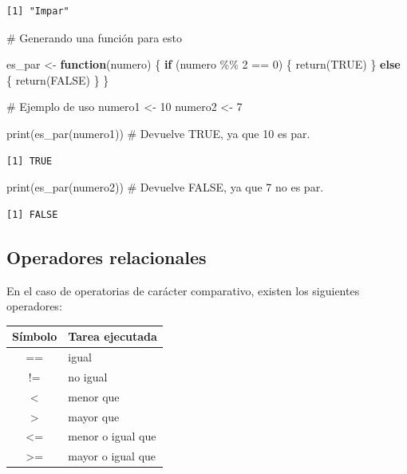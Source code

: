 \documentclass[
  letterpaper,
  DIV=11,
  numbers=noendperiod]{scrartcl}
\newenvironment{Shaded}{\begin{snugshade}}{\end{snugshade}}
\newcommand{\CommentTok}[1]{\textcolor[rgb]{0.37,0.37,0.37}{#1}}
\newcommand{\ConstantTok}[1]{\textcolor[rgb]{0.56,0.35,0.01}{#1}}
\newcommand{\ControlFlowTok}[1]{\textcolor[rgb]{0.00,0.23,0.31}{\textbf{#1}}}
\newcommand{\DecValTok}[1]{\textcolor[rgb]{0.68,0.00,0.00}{#1}}
\newcommand{\FunctionTok}[1]{\textcolor[rgb]{0.28,0.35,0.67}{#1}}
\newcommand{\NormalTok}[1]{\textcolor[rgb]{0.00,0.23,0.31}{#1}}
\newcommand{\OtherTok}[1]{\textcolor[rgb]{0.00,0.23,0.31}{#1}}
\newcommand{\SpecialCharTok}[1]{\textcolor[rgb]{0.37,0.37,0.37}{#1}}
\newcounter{none} %
\begin{document}
\begin{verbatim}
[1] "Impar"
\end{verbatim}

\begin{Shaded}
\begin{Highlighting}[]
\CommentTok{\# Generando una función para esto}

\NormalTok{es\_par }\OtherTok{\textless{}{-}} \ControlFlowTok{function}\NormalTok{(numero) \{}
  \ControlFlowTok{if}\NormalTok{ (numero }\SpecialCharTok{\%\%} \DecValTok{2} \SpecialCharTok{==} \DecValTok{0}\NormalTok{) \{}
    \FunctionTok{return}\NormalTok{(}\ConstantTok{TRUE}\NormalTok{)}
\NormalTok{  \} }\ControlFlowTok{else}\NormalTok{ \{}
    \FunctionTok{return}\NormalTok{(}\ConstantTok{FALSE}\NormalTok{)}
\NormalTok{  \}}
\NormalTok{\}}

\CommentTok{\# Ejemplo de uso}
\NormalTok{numero1 }\OtherTok{\textless{}{-}} \DecValTok{10}
\NormalTok{numero2 }\OtherTok{\textless{}{-}} \DecValTok{7}

\FunctionTok{print}\NormalTok{(}\FunctionTok{es\_par}\NormalTok{(numero1)) }\CommentTok{\# Devuelve TRUE, ya que 10 es par.}
\end{Highlighting}
\end{Shaded}

\begin{verbatim}
[1] TRUE
\end{verbatim}

\begin{Shaded}
\begin{Highlighting}[]
\FunctionTok{print}\NormalTok{(}\FunctionTok{es\_par}\NormalTok{(numero2)) }\CommentTok{\# Devuelve FALSE, ya que 7 no es par.}
\end{Highlighting}
\end{Shaded}

\begin{verbatim}
[1] FALSE
\end{verbatim}

\subsection{Operadores relacionales}\label{operadores-relacionales}

En el caso de operatorias de carácter comparativo, existen los
siguientes operadores:

{\def\LTcaptype{none} %
\begin{longtable}[]{@{}cl@{}}
\toprule\noalign{}
Símbolo & Tarea ejecutada \\
\midrule\noalign{}
\endhead
\bottomrule\noalign{}
\endlastfoot
== & igual \\
!= & no igual \\
\textless{} & menor que \\
\textgreater{} & mayor que \\
\textless= & menor o igual que \\
\textgreater= & mayor o igual que \\
\end{longtable}
}
\end{document}

